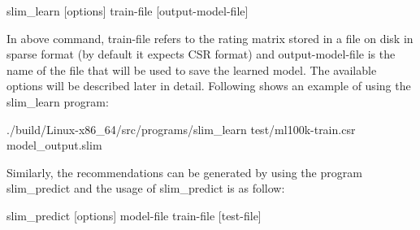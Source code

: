 \begin{DoxyVerb}slim_learn [options] train-file [output-model-file] 
\end{DoxyVerb}


In above command, {\ttfamily train-\/file} refers to the rating matrix stored in a file on disk in sparse format (by default it expects C\+SR format) and {\ttfamily output-\/model-\/file} is the name of the file that will be used to save the learned model. The available options will be described later in detail. Following shows an example of using the {\ttfamily slim\+\_\+learn} program\+:

\begin{DoxyVerb}./build/Linux-x86_64/src/programs/slim_learn test/ml100k-train.csr model_output.slim
\end{DoxyVerb}


Similarly, the recommendations can be generated by using the program {\ttfamily slim\+\_\+predict} and the usage of {\ttfamily slim\+\_\+predict} is as follow\+:

\begin{DoxyVerb}slim_predict [options] model-file train-file [test-file]
\end{DoxyVerb}


